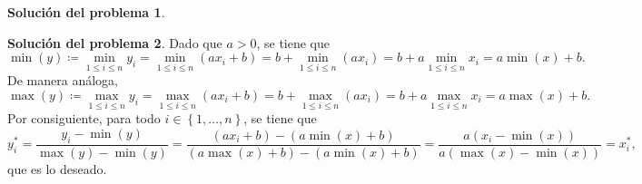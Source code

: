 \documentclass[twoside,12pt]{article}
\theoremstyle{definition}
\newtheorem{soln}{Solución del problema}
\begin{document}
\newpage
\begin{soln}

\end{soln}

\newpage
\begin{soln}
Dado que $a>0$, se tiene que
\[
\min(y)\coloneqq \min_{1\leq i\leq n} y_i=\min_{1\leq i\leq n}(ax_i+b) = b+\min_{1\leq i\leq n}(ax_i) = b+a\min_{1\leq i\leq n} x_i = a\min(x)+b.
\]
De manera análoga,
\[
\max(y)\coloneqq \max_{1\leq i\leq n} y_i=\max_{1\leq i\leq n}(ax_i+b) = b+\max_{1\leq i\leq n}(ax_i) = b+a\max_{1\leq i\leq n} x_i =a\max(x)+b.
\]
Por consiguiente, para todo $i\in \left\lbrace 1, \ldots, n \right\rbrace$, se tiene que
\[
y_i^* = \frac{y_i-\min(y)}{\max(y)-\min(y)} = \frac{\left(ax_i+b\right)-\left(a\min(x)+b\right)}{\left(a\max(x)+b\right)-\left(a\min(x)+b\right)} = \frac{a\left(x_i-\min(x)\right)}{a\left(\max(x)-\min(x)\right)} = x_i^*,
\]
que es lo deseado.
\end{soln}
\end{document}
